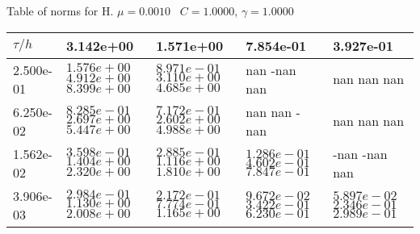 \begin{center}
Table of norms for H. $\mu = 0.0010$ \, $C = 1.0000$, $\gamma = 1.0000$
  
\begin{tabular}{|p{1in}|p{1in}|p{1in}|p{1in}|p{1in}|} \hline
$\tau / h$ &3.142e+00 &1.571e+00 &7.854e-01 &3.927e-01 \\ \hline 
2.500e-01 & $1.576e+00$  $4.912e+00$  $8.399e+00$  & $8.971e-01$  $3.110e+00$  $4.685e+00$  & nan -nan nan  & nan nan nan  \\ \hline 
6.250e-02 & $8.285e-01$  $2.697e+00$  $5.447e+00$  & $7.172e-01$  $2.602e+00$  $4.988e+00$  & nan nan -nan  & nan nan nan  \\ \hline 
1.562e-02 & $3.598e-01$  $1.404e+00$  $2.320e+00$  & $2.885e-01$  $1.116e+00$  $1.810e+00$  & $1.286e-01$  $4.602e-01$  $7.847e-01$  & -nan -nan nan  \\ \hline 
3.906e-03 & $2.984e-01$  $1.130e+00$  $2.008e+00$  & $2.172e-01$  $7.774e-01$  $1.165e+00$  & $9.672e-02$  $3.422e-01$  $6.230e-01$  & $5.897e-02$  $2.346e-01$  $2.989e-01$  \\ \hline 

\end{tabular}\\[20pt]
\end{center}
